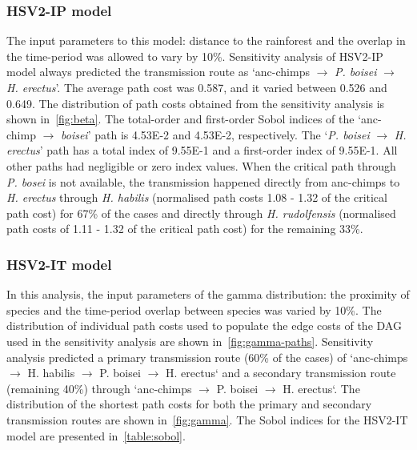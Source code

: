 \documentclass[fleqn,10pt]{wlscirep}
\begin{document}
\subsubsection*{HSV2-IP model}
The input parameters to this model: distance to the rainforest and the overlap in the time-period was allowed to vary by 10\%. Sensitivity analysis of HSV2-IP model always predicted the transmission route as `anc-chimps $\rightarrow$ \textit{P. boisei} $\rightarrow$ \textit{H. erectus}'. The average path cost was 0.587, and it varied between 0.526 and 0.649. The distribution of path costs obtained from the sensitivity analysis is shown in~\cref{fig:beta}. The total-order and first-order Sobol indices of the `anc-chimp $\rightarrow$ \textit{boisei}' path is 4.53E-2 and 4.53E-2, respectively. The `\textit{P. boisei} $\rightarrow$ \textit{H. erectus}' path has a total index of 9.55E-1 and a first-order index of 9.55E-1. All other paths had negligible or zero index values. When the critical path through \textit{P. bosei} is not available, the transmission happened directly from anc-chimps to \textit{H. erectus} through \textit{H. habilis} (normalised path costs 1.08 - 1.32 of the critical path cost) for 67\% of the cases and directly through \textit{H. rudolfensis} (normalised path costs of 1.11 - 1.32 of the critical path cost) for the remaining 33\%.

\subsubsection*{HSV2-IT model}
In this analysis, the input parameters of the gamma distribution: the proximity of species and the time-period overlap between species was varied by 10\%. The distribution of individual path costs used to populate the edge costs of the DAG used in the sensitivity analysis are shown in~\cref{fig:gamma-paths}. Sensitivity analysis predicted a primary transmission route (60\% of the cases) of `anc-chimps $\rightarrow$ H. habilis $\rightarrow$ P. boisei $\rightarrow$ H. erectus` and a secondary transmission route (remaining 40\%) through `anc-chimps $\rightarrow$ P. boisei $\rightarrow$ H. erectus`. The distribution of the shortest path costs for both the primary and secondary transmission routes are shown in~\cref{fig:gamma}. The Sobol indices for the HSV2-IT model are presented in~\cref{table:sobol}. 
\end{document}
